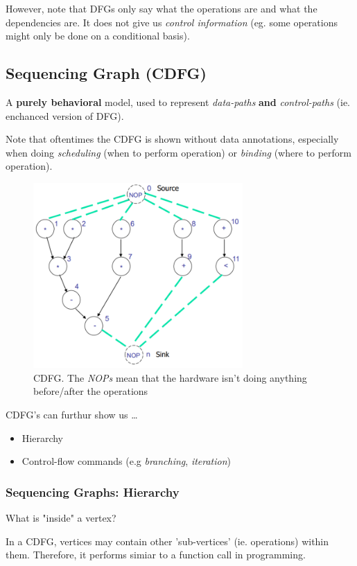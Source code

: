 \documentclass{article}
\begin{document}
However, note that DFGs only say what the operations are and what the dependencies are.
It does not give us \textit{control information} (eg. some operations might only be done on a conditional basis).

\subsection{Sequencing Graph (CDFG)}
A \textbf{purely behavioral} model, used to represent \textit{data-paths} \textbf{and} \textit{control-paths} (ie. enchanced version of DFG).

Note that oftentimes the CDFG is shown without data annotations, especially when doing \textit{scheduling} (when to perform operation) or \textit{binding} (where to perform operation).

\begin{figure}[htp]
    \centering
    \includegraphics[width=8cm, scale=1]{S1/sequencingGraph.PNG}
    \caption{CDFG. The \textit{NOPs} mean that the hardware isn't doing anything before/after the operations}
\end{figure}

CDFG's can furthur show us \dots
\begin{itemize}
    \item Hierarchy
    \item Control-flow commands (e.g \textit{branching}, \textit{iteration})
\end{itemize}


\newpage
\subsubsection{Sequencing Graphs: Hierarchy}
What is "inside" a vertex? 

In a CDFG, vertices may contain other 'sub-vertices' (ie. operations) within them. Therefore, it performs simiar to a function call in programming.
\end{document}
